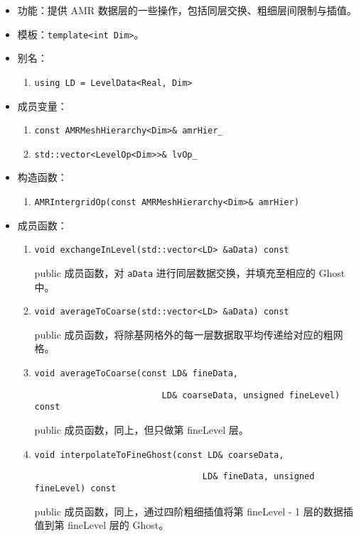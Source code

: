 \documentclass[cn, bibend=bibtex]{elegantpaper}
\theoremstyle{plain}
\begin{document}
\begin{itemize}
  \item 功能：提供 AMR 数据层的一些操作，包括同层交换、粗细层间限制与插值。
  \item 模板：\lstinline|template<int Dim>|。
  \item 别名：
  \begin{enumerate}
    \item \lstinline|using LD = LevelData<Real, Dim>|
  \end{enumerate}
  \item 成员变量：
  \begin{enumerate}
    \item \lstinline|const AMRMeshHierarchy<Dim>& amrHier_|
    \item \lstinline|std::vector<LevelOp<Dim>>& lvOp_|
 \end{enumerate}
  \item 构造函数：
  \begin{enumerate}
    \item \lstinline|AMRIntergridOp(const AMRMeshHierarchy<Dim>& amrHier)|
  \end{enumerate}
  \item 成员函数：
  \begin{enumerate}
    \item \lstinline|void exchangeInLevel(std::vector<LD> &aData) const|

    public 成员函数，对 \lstinline|aData| 进行同层数据交换，并填充至相应的 Ghost 中。

    \item \lstinline|void averageToCoarse(std::vector<LD> &aData) const|

    public 成员函数，将除基网格外的每一层数据取平均传递给对应的粗网格。

    \item \lstinline|void averageToCoarse(const LD& fineData, |
    
          \lstinline|                         LD& coarseData, unsigned fineLevel) const|
    
    public 成员函数，同上，但只做第 fineLevel 层。

    \item \lstinline|void interpolateToFineGhost(const LD& coarseData,|
    
          \lstinline|                                 LD& fineData, unsigned fineLevel) const|

    public 成员函数，同上，通过四阶粗细插值将第 fineLevel - 1 层的数据插值到第 fineLevel 层的 Ghost。


\end{enumerate}
\end{itemize}
\end{document}
